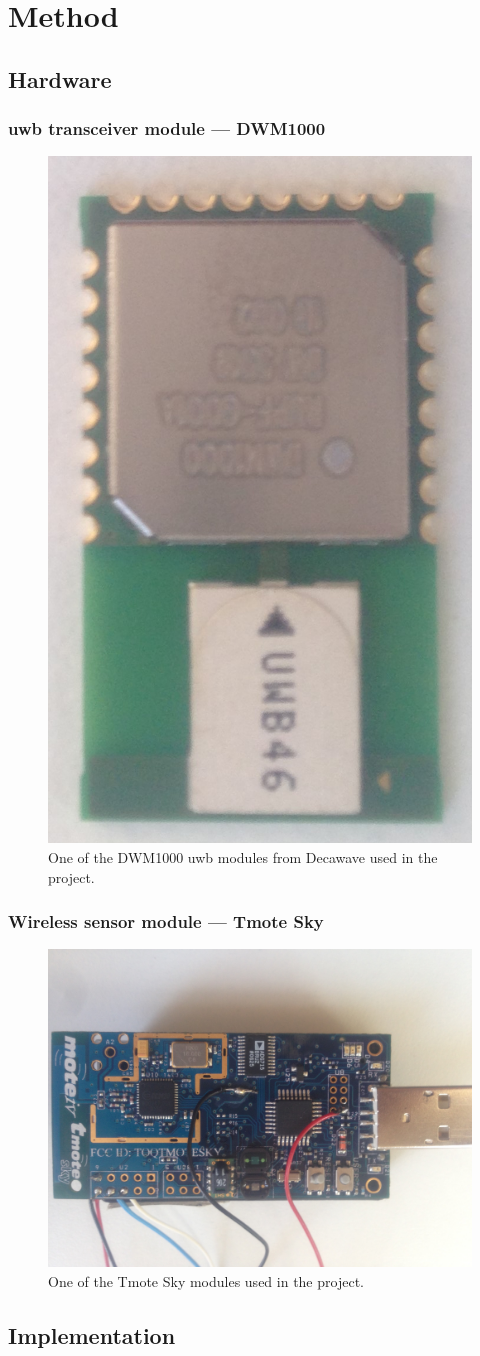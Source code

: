 \section{Method}
	\subsection{Hardware}
		\subsubsection{\gls{uwb} transceiver module — DWM1000}
			\begin{figure}[H] 
			  \centering
			      \includegraphics[height=0.45\textwidth, angle=180]{img/UWB-module}
			  \caption{One of the DWM1000 \gls{uwb} modules from Decawave used in the project.}
			  \label{fig_DWM1000}
			\end{figure}
		\subsubsection{Wireless sensor module — Tmote Sky}
			\begin{figure}[H] 
			  \centering
			      \includegraphics[height=0.45\textwidth]{img/Tmote}
			  \caption{One of the Tmote Sky modules used in the project.}
			  \label{fig_Tmote}
			\end{figure}
	\subsection{Implementation}
